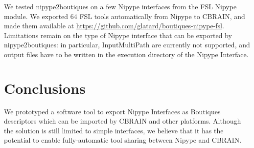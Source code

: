 \documentclass[twocolumn]{bmcart}%
\begin{document}
We tested nipype2boutiques on a few Nipype interfaces from the FSL
Nipype module. We exported 64 FSL tools automatically from Nipype to
CBRAIN, and made them available at
\url{https://github.com/glatard/boutiques-nipype-fsl}. Limitations
remain on the type of Nipype interface that can be exported by
nipype2boutiques: in particular, InputMultiPath are currently not
supported, and output files have to be written in the execution
directory of the Nipype Interface.

\section{Conclusions}\label{conclusions}

We prototyped a software tool to export Nipype Interfaces as Boutiques
descriptors which can be imported by CBRAIN and other platforms.
Although the solution is still limited to simple interfaces, we believe
that it has the potential to enable fully-automatic tool sharing between
Nipype and CBRAIN.

\end{document}
